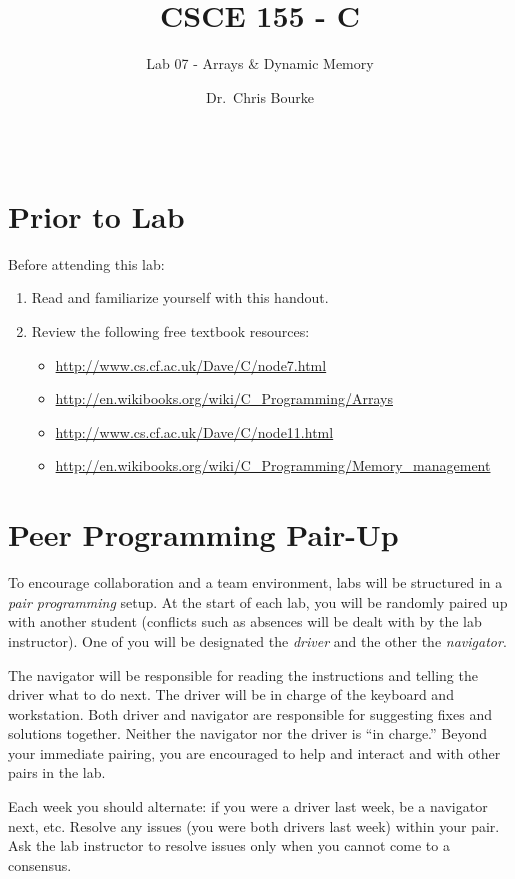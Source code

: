 \documentclass[12pt]{scrartcl}
\title{CSCE 155 - C}
\subtitle{Lab 07 - Arrays \& Dynamic Memory}
\author{Dr.\ Chris Bourke}
\date{~}
\begin{document}
\maketitle

\section*{Prior to Lab}

Before attending this lab:
\begin{enumerate}
  \item Read and familiarize yourself with this handout.
  \item Review the following free textbook resources:
	\begin{itemize}
  	  \item \url{http://www.cs.cf.ac.uk/Dave/C/node7.html} 
	  \item \url{http://en.wikibooks.org/wiki/C_Programming/Arrays}
	  \item \url{http://www.cs.cf.ac.uk/Dave/C/node11.html}
	  \item \url{http://en.wikibooks.org/wiki/C_Programming/Memory_management}
	\end{itemize}
\end{enumerate}

\section*{Peer Programming Pair-Up}

To encourage collaboration and a team environment, labs will be
structured in a \emph{pair programming} setup.  At the start of
each lab, you will be randomly paired up with another student 
(conflicts such as absences will be dealt with by the lab instructor).
One of you will be designated the \emph{driver} and the other
the \emph{navigator}.  

The navigator will be responsible for reading the instructions and
telling the driver what to do next.  The driver will be in charge of the
keyboard and workstation.  Both driver and navigator are responsible
for suggesting fixes and solutions together.  Neither the navigator
nor the driver is ``in charge.''  Beyond your immediate pairing, you
are encouraged to help and interact and with other pairs in the lab.

Each week you should alternate: if you were a driver last week, 
be a navigator next, etc.  Resolve any issues (you were both drivers
last week) within your pair.  Ask the lab instructor to resolve issues
only when you cannot come to a consensus.  
\end{document}
